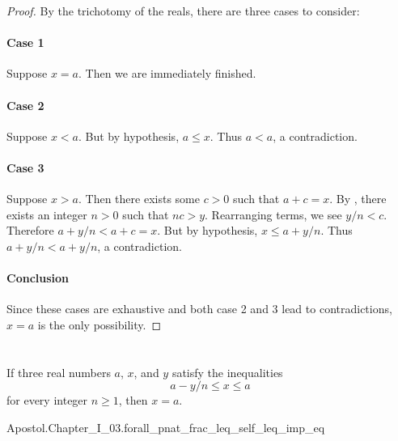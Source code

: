 \documentclass{report}
\begin{document}
  \begin{proof}

    By the trichotomy of the reals, there are three cases to consider:

    \paragraph{Case 1}%

      Suppose $x = a$.
      Then we are immediately finished.

    \paragraph{Case 2}%

      Suppose $x < a$.
      But by hypothesis, $a \leq x$.
      Thus $a < a$, a contradiction.

    \paragraph{Case 3}%

      Suppose $x > a$.
      Then there exists some $c > 0$ such that $a + c = x$.
      By , there exists an integer
        $n > 0$ such that $nc > y$.
      Rearranging terms, we see $y / n < c$.
      Therefore $a + y / n < a + c = x$.
      But by hypothesis, $x \leq a + y / n$.
      Thus $a + y / n < a + y / n$, a contradiction.

    \paragraph{Conclusion}%

      Since these cases are exhaustive and both case 2 and 3 lead to
        contradictions, $x = a$ is the only possibility.

  \end{proof}

\section{}%

  \begin{lemma}[2]
    If three real numbers $a$, $x$, and $y$ satisfy the inequalities
      $$a - y / n \leq x \leq a$$ for every integer $n \geq 1$, then $x = a$.
  \end{lemma}

    {Apostol.Chapter\_I\_03.forall\_pnat\_frac\_leq\_self\_leq\_imp\_eq}
\end{document}

